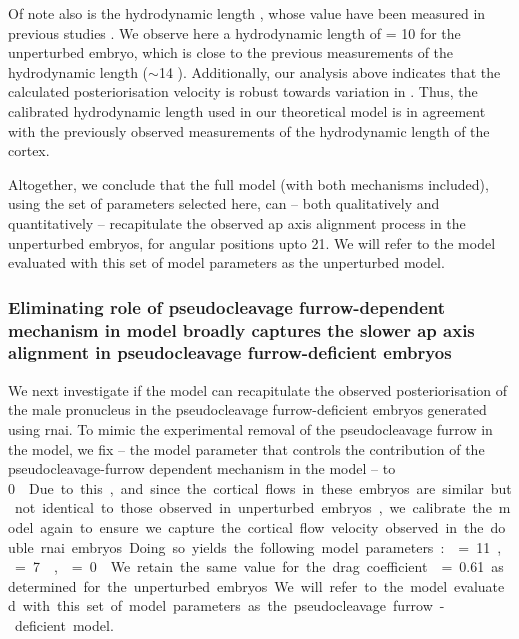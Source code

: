 Of note also is the hydrodynamic length \hydrodynamicLength, whose value have been measured in previous studies \citep{saha2016determining,mayer2010anisotropies}. We observe here a hydrodynamic length of \hydrodynamicLength = \SI{10}{\unitLength} for the unperturbed embryo, which is close to the previous measurements of the hydrodynamic length ($\sim$\SI{14}{\unitLength} \citep{saha2016determining,mayer2010anisotropies}). Additionally, our analysis above indicates that the calculated posteriorisation velocity is robust towards variation in \hydrodynamicLength. Thus, the calibrated hydrodynamic length used in our theoretical model is in agreement with the previously observed measurements of the hydrodynamic length of the cortex. 

Altogether, we conclude that the full model (with both mechanisms included), using the set of parameters selected here, can -- both qualitatively and quantitatively -- recapitulate the observed \ac{ap} axis alignment process in the unperturbed embryos, for angular positions upto \SI{21}{\unitAngle}. We will refer to the model evaluated with this set of model parameters as the unperturbed model.

\subsubsection{Eliminating role of pseudocleavage furrow-dependent mechanism in model broadly captures the slower \acs{ap} axis alignment in pseudocleavage furrow-deficient embryos}\label{subsubsec:cytoModelForNop1Mel11}
We next investigate if the model can recapitulate the observed posteriorisation of the male pronucleus in the pseudocleavage furrow-deficient embryos generated using  \ac{rnai}. To mimic the experimental removal of the pseudocleavage furrow in the model, we fix \nematicLength -- the model parameter that controls the contribution of the pseudocleavage-furrow dependent mechanism in the model -- to \SI{0}{\square\unitLength\per\second}. Due to this, and since the cortical flows in these embryos are similar but not identical to those observed in unperturbed embryos, we calibrate the model again to ensure we capture the cortical flow velocity observed in the double \ac{rnai} embryos. Doing so yields the following model parameters: \hydrodynamicLength = \SI{11}{\unitLength}, \activeRelaxLength = \SI{7}{\square\unitLength\per\second}, \nematicLength = \SI{0}{\square\unitLength\per\second}. We retain the same value for the drag coefficient \dragCoefficient = \num{0.61} as determined for the unperturbed embryos. We will refer to the model evaluated with this set of model parameters as the pseudocleavage furrow-deficient model.

